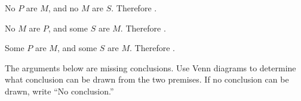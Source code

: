 \begin{exercises}
\item \label{itm:no_conclusion_set1_EEE} No $P$ are $M$, and no $M$ are $S$. Therefore \underline{\hspace{2cm}}.
 
\item No $M$ are $P$, and some $S$ are $M$. Therefore \underline{\hspace{2cm}}.
\item Some $P$ are $M$, and some $S$ are $M$. Therefore \underline{\hspace{2cm}}. 
  \end{exercises}

\noindent \problempart The arguments below are missing conclusions. Use Venn diagrams to determine what conclusion can be drawn from the two premises. If no conclusion can be drawn, write ``No conclusion.'' 

